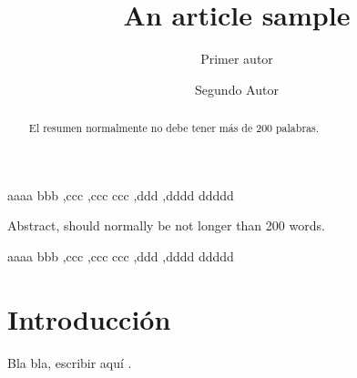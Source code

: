 \documentclass[4p,times]{matua-article}
\theoremstyle{plain}
\begin{document}
\begin{frontmatter}{}




\title{An article sample}






\author[rvt]{Primer autor }




\author[rvt,focal]{Segundo Autor}












\address[rvt]{Barranquilla Colombia }


\address[focal]{Kilométro 7 via a Puerto colombia }
\begin{abstract}
El resumen normalmente no debe tener más de 200 palabras.\end{abstract}
\begin{keyword}
aaaa bbb \sep ccc \sep ccc \PACS ccc \sep ddd \sep dddd \MSC[2008]ddddd\end{keyword}
\begin{resumen}
Abstract, should normally be not longer than 200 words.\end{resumen}
\begin{palabras}
aaaa bbb \sep ccc \sep ccc \PACS ccc \sep ddd \sep dddd \MSC[2008]ddddd
\end{palabras}

\end{frontmatter}{}




\section{Introducción}

Bla bla, escribir aquí \cite{Shiryayev,key-1}.
\end{document}
